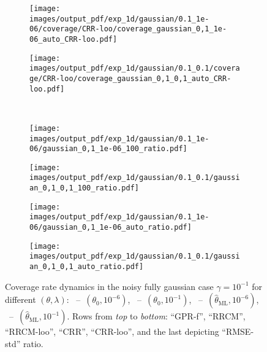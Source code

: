 \documentclass[a4paper,14pt]{extarticle}
\begin{document}
\begin{figure}
\begin{subfigure}[b]{0.25\linewidth}
  \end{subfigure}%
  \begin{subfigure}[b]{0.25\linewidth}
    \texttt{[image: images/output\_pdf/exp\_1d/gaussian/0.1\_1e-06/coverage/CRR-loo/coverage\_gaussian\_0,1\_1e-06\_auto\_CRR-loo.pdf]}
  \end{subfigure}%
  \begin{subfigure}[b]{0.25\linewidth}
    \texttt{[image: images/output\_pdf/exp\_1d/gaussian/0.1\_0.1/coverage/CRR-loo/coverage\_gaussian\_0,1\_0,1\_auto\_CRR-loo.pdf]}
  \end{subfigure}\\
  \begin{subfigure}[b]{0.25\linewidth}
    \texttt{[image: images/output\_pdf/exp\_1d/gaussian/0.1\_1e-06/gaussian\_0,1\_1e-06\_100\_ratio.pdf]}
    \caption{} \label{fig:gaussian_1d_high_noise_c1}
  \end{subfigure}%
  \begin{subfigure}[b]{0.25\linewidth}
    \texttt{[image: images/output\_pdf/exp\_1d/gaussian/0.1\_0.1/gaussian\_0,1\_0,1\_100\_ratio.pdf]}
    \caption{} \label{fig:gaussian_1d_high_noise_c2}
  \end{subfigure}%
  \begin{subfigure}[b]{0.25\linewidth}
    \texttt{[image: images/output\_pdf/exp\_1d/gaussian/0.1\_1e-06/gaussian\_0,1\_1e-06\_auto\_ratio.pdf]}
    \caption{} \label{fig:gaussian_1d_high_noise_c3}
  \end{subfigure}%
  \begin{subfigure}[b]{0.25\linewidth}
    \texttt{[image: images/output\_pdf/exp\_1d/gaussian/0.1\_0.1/gaussian\_0,1\_0,1\_auto\_ratio.pdf]}
    \caption{} \label{fig:gaussian_1d_high_noise_c4}
  \end{subfigure}%
  \caption{Coverage rate dynamics in the noisy fully gaussian case $\gamma=10^{-1}$
  for different $(\theta, \lambda)$:
  ~--~$(\theta_0, 10^{-6})$,
  ~--~$(\theta_0, 10^{-1})$,
  ~--~$(\hat{\theta}_\text{ML}, 10^{-6})$,
  ~--~$(\hat{\theta}_\text{ML}, 10^{-1})$.
  Rows from \textit{top} to \textit{bottom}: ``GPR-f'', ``RRCM'', ``RRCM-loo'',
  ``CRR'', ``CRR-loo'', and the last depicting ``RMSE-std'' ratio.}
  \label{fig:gaussian_1d_high_noise}
\end{figure}
\end{document}
